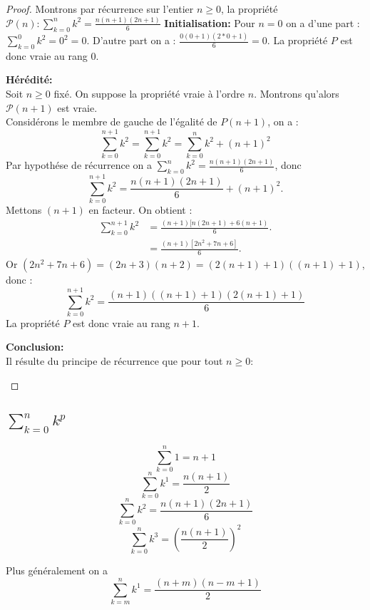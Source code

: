 \documentclass[a4paper, 11pt,reqno]{article}
\begin{document}
\begin{proof}
Montrons par r\'ecurrence sur l'entier $n\geq 0$, la propri\'et\'e $\mathcal{P}(n):\sum_{k=0}^n k^2=\frac{n(n+1)(2n+1)}{6}$
\noindent
\textbf{Initialisation:}  Pour $n=0$ on a d'une part :$\sum_{k=0}^0 k^2 =0^2=0$. D'autre part on a : $\frac{0(0+1)(2*0+1)}{6}=0$. La propriété $P$ est donc vraie au rang $0$. 

 \textbf{H\'er\'edit\'e:}\\
Soit $n\geq 0$ fix\'e. On suppose la propri\'et\'e vraie \`a l'ordre $n$. Montrons qu'alors $\mathcal{P}(n+1)$ est vraie.\\

Considérons le membre de gauche de l'égalité de $P(n+1)$, on a : 
\begin{equation*}
\sum_{k=0}^{n+1} k^2 = \sum_{k=0}^{n+1} k^2  = \sum_{k=0}^{n} k^2  +(n+1)^2
\end{equation*}
Par hypothése de récurrence on a $ \sum_{k=0}^{n} k^2  = \frac{n(n+1)(2n+1)}{6}$, donc 
$$\sum_{k=0}^{n+1} k^2 = \frac{n(n+1)(2n+1)}{6}+(n+1)^2.$$
Mettons $(n+1)$ en facteur. On obtient : 
\begin{align*}
\sum_{k=0}^{n+1} k^2 & = \frac{(n+1)[n(2n+1)+6(n+1)}{6}.\\
								& = \frac{(n+1)[2n^2+7n+6]}{6}.
\end{align*}
Or $(2n^2+7n+6)=(2n+3)(n+2)=(2(n+1)+1) ( (n+1)+1)$, donc :
		$$\sum_{k=0}^{n+1} k^2  =\frac{(n+1)((n+1)+1) (2(n+1)+1)			}{6}$$
La propriété $P$ est donc vraie au rang $n+1$.

\textbf{Conclusion:}\\
Il r\'esulte du principe de r\'ecurrence que pour tout $ n\geq 0$:
\begin{center}
\end{center}






\end{proof}


\subsection{$\sum_{k=0}^n k^p$ }

\begin{prop}
$$\sum_{k=0}^n 1= n+1$$
$$\sum_{k=0}^n k^1=\frac{n(n+1)}{2}$$
$$\sum_{k=0}^n k^2= \frac{n(n+1)(2n+1)}{6}$$
$$\sum_{k=0}^n k^3=\left(\frac{n(n+1)}{2}\right)^2$$
\end{prop}
Plus généralement on a 
$$\sum_{k=m}^n k^1=\frac{(n+m)(n-m+1)}{2}$$
\end{document}
